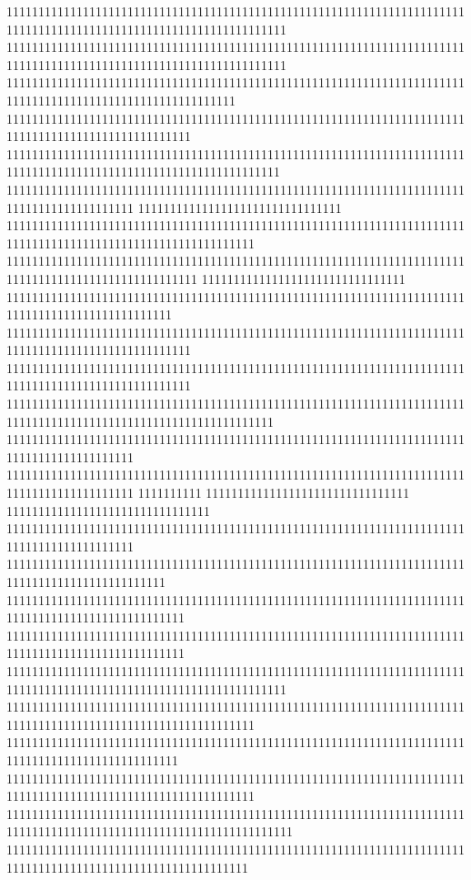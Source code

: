11111111111111111111111111111111111111111111111111111111111111111111111111111111111111111111111111111111111111111111
11111111111111111111111111111111111111111111111111111111111111111111111111111111111111111111111111111111111111111111
111111111111111111111111111111111111111111111111111111111111111111111111111111111111111111111111111111111111
11111111111111111111111111111111111111111111111111111111111111111111111111111111111111111111111111111
1111111111111111111111111111111111111111111111111111111111111111111111111111111111111111111111111111111111111111111
11111111111111111111111111111111111111111111111111111111111111111111111111111111111111111111
11111111111111111111111111111111
111111111111111111111111111111111111111111111111111111111111111111111111111111111111111111111111111111111111111
111111111111111111111111111111111111111111111111111111111111111111111111111111111111111111111111111111
11111111111111111111111111111111
11111111111111111111111111111111111111111111111111111111111111111111111111111111111111111111111111
11111111111111111111111111111111111111111111111111111111111111111111111111111111111111111111111111111
11111111111111111111111111111111111111111111111111111111111111111111111111111111111111111111111111111
111111111111111111111111111111111111111111111111111111111111111111111111111111111111111111111111111111111111111111
11111111111111111111111111111111111111111111111111111111111111111111111111111111111111111111
11111111111111111111111111111111111111111111111111111111111111111111111111111111111111111111
1111111111
11111111111111111111111111111111
11111111111111111111111111111111
11111111111111111111111111111111111111111111111111111111111111111111111111111111111111111111
1111111111111111111111111111111111111111111111111111111111111111111111111111111111111111111111111
1111111111111111111111111111111111111111111111111111111111111111111111111111111111111111111111111111
1111111111111111111111111111111111111111111111111111111111111111111111111111111111111111111111111111
11111111111111111111111111111111111111111111111111111111111111111111111111111111111111111111111111111111111111111111
111111111111111111111111111111111111111111111111111111111111111111111111111111111111111111111111111111111111111
111111111111111111111111111111111111111111111111111111111111111111111111111111111111111111111111111
111111111111111111111111111111111111111111111111111111111111111111111111111111111111111111111111111111111111111
111111111111111111111111111111111111111111111111111111111111111111111111111111111111111111111111111111111111111111111
11111111111111111111111111111111111111111111111111111111111111111111111111111111111111111111111111111111111111
